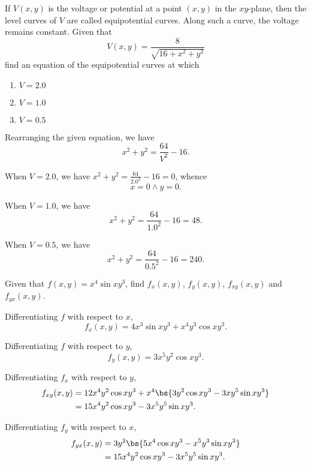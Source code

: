 \begin{problem}
    If $V(x, y)$ is the voltage or potential at a point $(x, y)$ in the $xy$-plane, then the level curves of $V$ are called equipotential curves. Along such a curve, the voltage remains constant. Given that \[V(x, y) = \frac{8}{\sqrt{16 + x^2 + y^2}}\] find an equation of the equipotential curves at which
    \begin{enumerate}
        \item $V = 2.0$
        \item $V = 1.0$
        \item $V = 0.5$
    \end{enumerate}
\end{problem}
\begin{solution}
    Rearranging the given equation, we have \[x^2 + y^2 = \frac{64}{V^2} - 16.\]

    \begin{ppart}
        When $V = 2.0$, we have $x^2 + y^2 = \frac{64}{2.0^2} - 16 = 0$, whence \[x = 0 \land y = 0.\]
    \end{ppart}
    \begin{ppart}
        When $V = 1.0$, we have \[x^2 + y^2 = \frac{64}{1.0^2} - 16 = 48.\]
    \end{ppart}
    \begin{ppart}
        When $V = 0.5$, we have \[x^2 + y^2 = \frac{64}{0.5^2} - 16 = 240.\]
    \end{ppart}
\end{solution}

\begin{problem}
    Given that $f(x, y) = x^4 \sin{xy^3}$, find $f_x(x, y)$, $f_y(x, y)$, $f_{xy}(x, y)$ and $f_{yx}(x, y)$.
\end{problem}
\begin{solution}
    Differentiating $f$ with respect to $x$, \[f_x(x, y) = 4x^3 \sin{xy^3} + x^4 y^3 \cos{xy^3}.\]

    Differentiating $f$ with respect to $y$, \[f_y(x, y) = 3x^5y^2\cos{xy^3}.\]

    Differentiating $f_x$ with respect to $y$, 
    \begin{align*}
        f_{xy}(x, y) &= 12x^4y^2\cos{xy^3} + x^4\bs{3y^2\cos{xy^3} - 3xy^5\sin{xy^3}}\\
        &= 15x^4y^2\cos{xy^3} - 3x^5y^5\sin{xy^3}.
    \end{align*}

    Differentiating $f_y$ with respect to $x$,
    \begin{align*}
        f_{yx}(x, y) &= 3y^2\bs{5x^4 \cos{xy^3} - x^5y^3\sin{xy^3}}\\
        &= 15x^4y^2 \cos{xy^3} - 3x^5y^5 \sin{xy^3}.
    \end{align*}
\end{solution}

